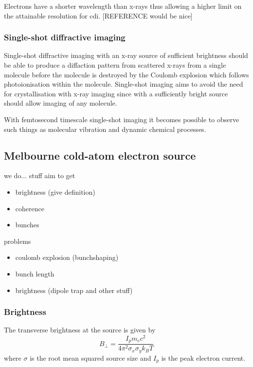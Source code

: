 Electrons have a shorter wavelength than x-rays thus allowing a higher limit on the attainable resolution for \gls{cdi}. [REFERENCE would be nice] 

\subsubsection{Single-shot diffractive imaging}
Single-shot diffractive imaging with an x-ray source of sufficient brightness should be able to produce a diffaction pattern from scattered x-rays from a single molecule before the molecule is destroyed by the Coulomb explosion which follows photoionisation within the molecule\cite{henderson_potential_1995, neutze_potential_2000}. Single-shot imaging aims to avoid the need for crystallisation with x-ray imaging since with a sufficiently bright source should allow imaging of any molecule.

With femtosecond timescale single-shot imaging it becomes possible to observe such things as molecular vibration and dynamic chemical processes\cite{zewail_4d_2006}.

\subsection{Melbourne cold-atom electron source}
we do... stuff
aim to get
\begin{itemize}
    \item brightness (give definition)
    \item coherence
    \item bunches
\end{itemize}

problems
\begin{itemize}
    \item coulomb explosion (bunchshaping)
    \item bunch length
    \item brightness (dipole trap and other stuff)
\end{itemize}

\subsubsection{Brightness}
The transverse brightness at the source is given by\cite{reiser_theory_2008}
\begin{equation}
B_\perp = \frac{I_p m_e c^2}{4 \pi^2 \sigma_x \sigma_y k_B T}
\end{equation}
where $\sigma$ is the root mean squared source size and $I_p$ is the peak electron current.

